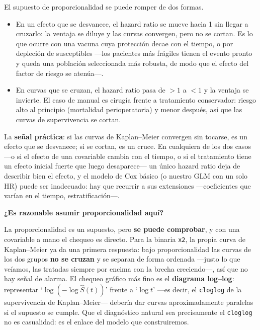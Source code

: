\documentclass[
  letterpaper,
  DIV=11,
  numbers=noendperiod]{scrartcl}
\providecommand{\tightlist}{%
  \setlength{\itemsep}{0pt}\setlength{\parskip}{0pt}}\usepackage{longtable,booktabs,array}
\begin{document}
\begin{tcolorbox}[enhanced jigsaw, coltitle=black, rightrule=.15mm, arc=.35mm, leftrule=.75mm, colback=white, colbacktitle=quarto-callout-note-color!10!white, left=2mm, breakable, toptitle=1mm, toprule=.15mm, bottomtitle=1mm, titlerule=0mm, title=\textcolor{quarto-callout-note-color}{\faInfo}\hspace{0.5em}{Cuándo falla la proporcionalidad}, bottomrule=.15mm, opacityback=0, opacitybacktitle=0.6, colframe=quarto-callout-note-color-frame]

El supuesto de proporcionalidad se puede romper de dos formas.

\begin{itemize}
\tightlist
\item
  En un efecto que se desvanece, el hazard ratio se mueve hacia 1 sin
  llegar a cruzarlo: la ventaja se diluye y las curvas convergen, pero
  no se cortan. Es lo que ocurre con una vacuna cuya protección decae
  con el tiempo, o por depleción de susceptibles ---los pacientes más
  frágiles tienen el evento pronto y queda una población seleccionada
  más robusta, de modo que el efecto del factor de riesgo se atenúa---.
\item
  En curvas que se cruzan, el hazard ratio pasa de \(>1\) a \(<1\) y la
  ventaja se invierte. El caso de manual es cirugía frente a tratamiento
  conservador: riesgo alto al principio (mortalidad perioperatoria) y
  menor después, así que las curvas de supervivencia se cortan.
\end{itemize}

La \textbf{señal práctica}: si las curvas de Kaplan--Meier convergen sin
tocarse, es un efecto que se desvanece; si se cortan, es un cruce. En
cualquiera de los dos casos ---o si el efecto de una covariable cambia
con el tiempo, o si el tratamiento tiene un efecto inicial fuerte que
luego desaparece--- un único hazard ratio deja de describir bien el
efecto, y el modelo de Cox básico (o nuestro GLM con un solo HR) puede
ser inadecuado: hay que recurrir a sus extensiones ---coeficientes que
varían en el tiempo, estratificación---.

\end{tcolorbox}

\textbf{¿Es razonable asumir proporcionalidad aquí?}

La proporcionalidad es un supuesto, pero \textbf{se puede comprobar}, y
con una covariable a mano el chequeo es directo. Para la binaria
\texttt{x2}, la propia curva de Kaplan--Meier ya da una primera
respuesta: bajo proporcionalidad las curvas de los dos grupos \textbf{no
se cruzan} y se separan de forma ordenada ---justo lo que veíamos, las
tratadas siempre por encima con la brecha creciendo---, así que no hay
señal de alarma. El chequeo gráfico más fino es el \textbf{diagrama
log--log}: representar `\(\log(-\log\widehat S(t))\)' frente a
`\(\log t\)' ---es decir, el \texttt{cloglog} de la supervivencia de
Kaplan--Meier--- debería dar curvas aproximadamente paralelas si el
supuesto se cumple. Que el diagnóstico natural sea precisamente el
\texttt{cloglog} no es casualidad: es el enlace del modelo que
construiremos.
\end{document}
